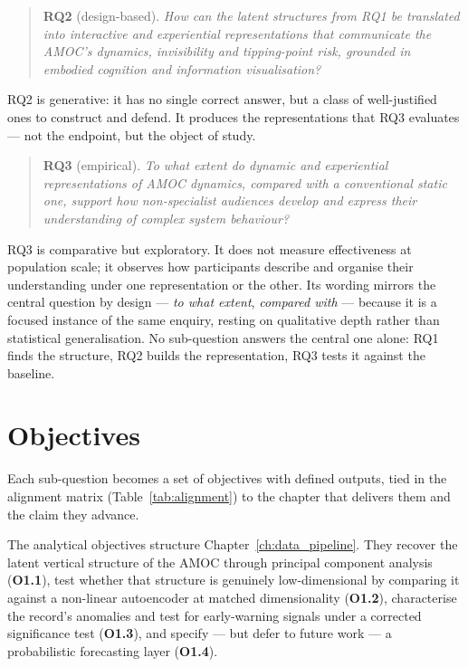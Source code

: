 \begin{quote}
\textbf{RQ2} (design-based). \emph{How can the latent structures from RQ1 be translated into interactive and experiential representations that communicate the AMOC's dynamics, invisibility and tipping-point risk, grounded in embodied cognition and information visualisation?}
\end{quote}

RQ2 is generative: it has no single correct answer, but a class of well-justified ones to construct and defend. It produces the representations that RQ3 evaluates --- not the endpoint, but the object of study.

\begin{quote}
\textbf{RQ3} (empirical). \emph{To what extent do dynamic and experiential representations of AMOC dynamics, compared with a conventional static one, support how non-specialist audiences develop and express their understanding of complex system behaviour?}
\end{quote}

RQ3 is comparative but exploratory. It does not measure effectiveness at population scale; it observes how participants describe and organise their understanding under one representation or the other. Its wording mirrors the central question by design --- \emph{to what extent}, \emph{compared with} --- because it is a focused instance of the same enquiry, resting on qualitative depth rather than statistical generalisation. No sub-question answers the central one alone: RQ1 finds the structure, RQ2 builds the representation, RQ3 tests it against the baseline.

\section{Objectives}
\label{sec:objectives}

Each sub-question becomes a set of objectives with defined outputs, tied in the alignment matrix (Table~\ref{tab:alignment}) to the chapter that delivers them and the claim they advance.

The analytical objectives structure Chapter~\ref{ch:data_pipeline}. They recover the latent vertical structure of the AMOC through principal component analysis (\textbf{O1.1}), test whether that structure is genuinely low-dimensional by comparing it against a non-linear autoencoder at matched dimensionality (\textbf{O1.2}), characterise the record's anomalies and test for early-warning signals under a corrected significance test (\textbf{O1.3}), and specify --- but defer to future work --- a probabilistic forecasting layer (\textbf{O1.4}).

